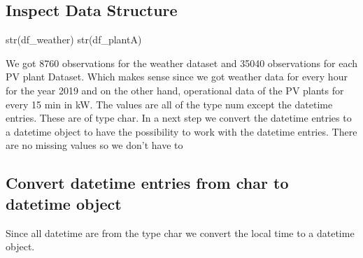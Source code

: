 \documentclass[
]{article}
\newenvironment{Shaded}{\begin{snugshade}}{\end{snugshade}}
\newcommand{\AttributeTok}[1]{\textcolor[rgb]{0.77,0.63,0.00}{#1}}
\newcommand{\FunctionTok}[1]{\textcolor[rgb]{0.00,0.00,0.00}{#1}}
\newcommand{\NormalTok}[1]{#1}
\newcommand{\OtherTok}[1]{\textcolor[rgb]{0.56,0.35,0.01}{#1}}
\newcommand{\SpecialCharTok}[1]{\textcolor[rgb]{0.00,0.00,0.00}{#1}}
\newcommand{\StringTok}[1]{\textcolor[rgb]{0.31,0.60,0.02}{#1}}
\begin{document}
\hypertarget{inspect-data-structure}{%
\subsection{Inspect Data Structure}\label{inspect-data-structure}}

\begin{Shaded}
\begin{Highlighting}[]
\FunctionTok{str}\NormalTok{(df\_weather)}
\FunctionTok{str}\NormalTok{(df\_plantA)}
\end{Highlighting}
\end{Shaded}

We got 8760 observations for the weather dataset and 35040 observations
for each PV plant Dataset. Which makes sense since we got weather data
for every hour for the year 2019 and on the other hand, operational data
of the PV plants for every 15 min in kW. The values are all of the type
num except the datetime entries. These are of type char. In a next step
we convert the datetime entries to a datetime object to have the
possibility to work with the datetime entries. There are no missing
values so we don't have to

\hypertarget{convert-datetime-entries-from-char-to-datetime-object}{%
\subsection{Convert datetime entries from char to datetime
object}\label{convert-datetime-entries-from-char-to-datetime-object}}

Since all datetime are from the type char we convert the local time to a
datetime object.

\begin{Shaded}
\end{Shaded}
\end{document}
